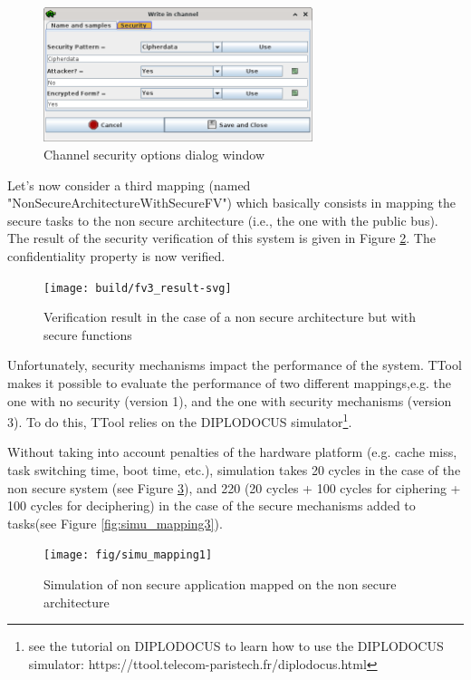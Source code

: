 \documentclass[12pt]{article}
\begin{document}
\begin{figure}[htbp]
\centering
\includegraphics[width=0.7\textwidth]{fig/channelsecurityTab.png}
\caption{Channel security options dialog window} \label{fig:channelsec}
\end{figure}

Let's now consider a third mapping (named "NonSecureArchitectureWithSecureFV") which basically consists in mapping the secure tasks to the non secure architecture (i.e., the one with the public bus). The result of the security verification of this system is given in Figure \ref{fig:fv3_result}. The confidentiality property is now verified.

\begin{figure}[htbp]
\centering
\texttt{[image: build/fv3\_result-svg]}
\caption{Verification result in the case of a non secure architecture but with secure functions} \label{fig:fv3_result}
\end{figure}

Unfortunately, security mechanisms impact the performance of the system. TTool makes it possible to evaluate the performance of two different mappings,e.g. the one with no security (version 1), and the one with security mechanisms (version 3). To do this, TTool relies on the DIPLODOCUS simulator\footnote{see the tutorial on DIPLODOCUS to learn how to use the DIPLODOCUS simulator: https://ttool.telecom-paristech.fr/diplodocus.html}.

Without taking into account penalties of the hardware platform (e.g. cache miss, task switching time, boot time, etc.), simulation takes 20 cycles in the case of the non secure system (see Figure \ref{fig:simu_mapping1}), and 220 (20 cycles + 100 cycles for ciphering + 100 cycles for deciphering) in the case of the secure mechanisms added to tasks(see Figure \ref{fig:simu_mapping3}).

\begin{figure}[htbp]
\centering
\texttt{[image: fig/simu\_mapping1]}
\caption{Simulation of non secure application mapped on the non secure architecture} \label{fig:simu_mapping1}
\end{figure}
\end{document}
